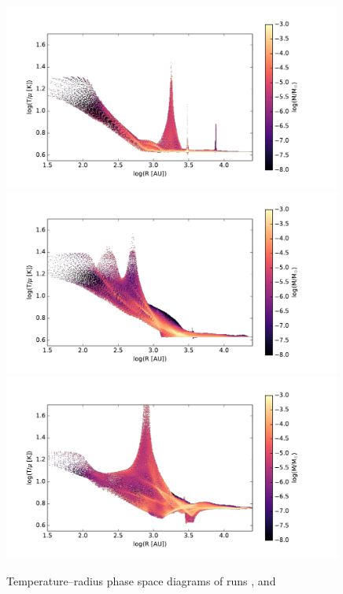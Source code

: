 \begin{figure}[!htb]
 \centering
 \includegraphics[width=0.99\textwidth]{Figures/var_rt_larson_plots/temp_R_hist_n100c10}
 \includegraphics[width=0.99\textwidth]{Figures/var_rt_larson_plots/temp_R_hist_n10c10}
 \includegraphics[width=0.99\textwidth]{Figures/var_rt_larson_plots/temp_R_hist_n1c10}
 \captionsetup{justification=justified,singlelinecheck=false,width=\linewidth}
 \decoRule
 \caption[ T--R phase diagrams]{Temperature--radius phase space diagrams of runs ,  and }
\label{fig:c10.0_T_R_larson}
\end{figure}
\FloatBarrier
